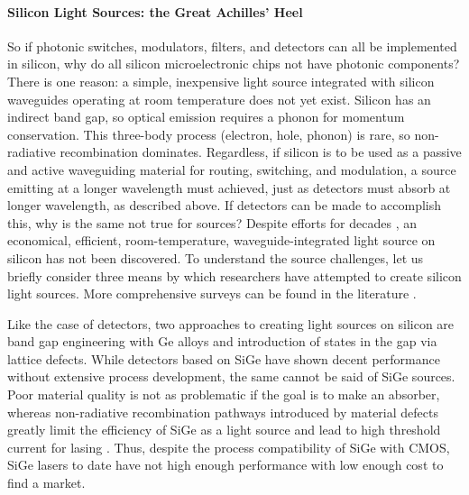 \paragraph{Silicon Light Sources: the Great Achilles' Heel}
So if photonic switches, modulators, filters, and detectors can all be implemented in silicon, why do all silicon microelectronic chips not have photonic components? There is one reason: a simple, inexpensive light source integrated with silicon waveguides operating at room temperature does not yet exist. Silicon has an indirect band gap, so optical emission requires a phonon for momentum conservation. This three-body process (electron, hole, phonon) is rare, so non-radiative recombination dominates. Regardless, if silicon is to be used as a passive and active waveguiding material for routing, switching, and modulation, a source emitting at a longer wavelength must achieved, just as detectors must absorb at longer wavelength, as described above. If detectors can be made to accomplish this, why is the same not true for sources? Despite efforts for decades \cite{shxu2007}, an economical, efficient, room-temperature, waveguide-integrated light source on silicon has not been discovered. To understand the source challenges, let us briefly consider three means by which researchers have attempted to create silicon light sources. More comprehensive surveys can be found in the literature \cite{li2005,shxu2007,libo2010,zhyi2015}.

Like the case of detectors, two approaches to creating light sources on silicon are band gap engineering with Ge alloys and introduction of states in the gap via lattice defects. While detectors based on SiGe have shown decent performance without extensive process development, the same cannot be said of SiGe sources. Poor material quality is not as problematic if the goal is to make an absorber, whereas non-radiative recombination pathways introduced by material defects greatly limit the efficiency of SiGe as a light source and lead to high threshold current for lasing \cite{zhyi2015}. Thus, despite the process compatibility of SiGe with CMOS, SiGe lasers to date have not high enough performance with low enough cost to find a market. 


